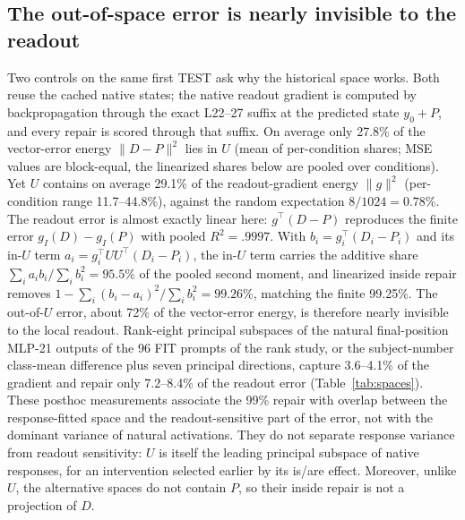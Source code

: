 \documentclass[11pt]{article}
\begin{document}
\subsection{The out-of-space error is nearly invisible to the readout}
Two controls on the same first TEST ask why the historical space works. Both reuse the cached native states; the native readout gradient is computed by backpropagation through the exact L22--27 suffix at the predicted state $y_0+P$, and every repair is scored through that suffix. On average only 27.8\% of the vector-error energy $\|D-P\|^2$ lies in $U$ (mean of per-condition shares; MSE values are block-equal, the linearized shares below are pooled over conditions). Yet $U$ contains on average 29.1\% of the readout-gradient energy $\|g\|^2$ (per-condition range 11.7--44.8\%), against the random expectation $8/1024=0.78\%$. The readout error is almost exactly linear here: $g^\top(D-P)$ reproduces the finite error $g_I(D)-g_I(P)$ with pooled $R^2=.9997$. With $b_i=g_i^\top(D_i-P_i)$ and its in-$U$ term $a_i=g_i^\top UU^\top(D_i-P_i)$, the in-$U$ term carries the additive share $\sum_i a_ib_i/\sum_i b_i^2=95.5\%$ of the pooled second moment, and linearized inside repair removes $1-\sum_i(b_i-a_i)^2/\sum_i b_i^2=99.26\%$, matching the finite 99.25\%. The out-of-$U$ error, about 72\% of the vector-error energy, is therefore nearly invisible to the local readout. Rank-eight principal subspaces of the natural final-position MLP-21 outputs of the 96 FIT prompts of the rank study, or the subject-number class-mean difference plus seven principal directions, capture 3.6--4.1\% of the gradient and repair only 7.2--8.4\% of the readout error (Table~\ref{tab:spaces}). These posthoc measurements associate the 99\% repair with overlap between the response-fitted space and the readout-sensitive part of the error, not with the dominant variance of natural activations. They do not separate response variance from readout sensitivity: $U$ is itself the leading principal subspace of native responses, for an intervention selected earlier by its is/are effect. Moreover, unlike $U$, the alternative spaces do not contain $P$, so their inside repair is not a projection of $D$.
\end{document}
